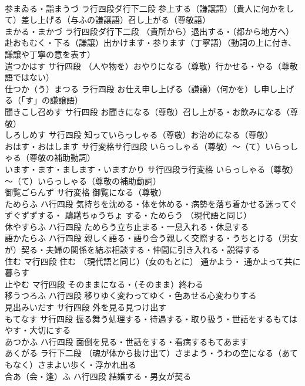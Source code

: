 \documentclass[8pt]{extreport}
\begin{document}
\begin{CJK}{UTF8}{min}
\\	参まゐる・詣まうづ		ラ行四段ダ行下二段	参上する（謙譲語）（貴人に何かをして）差し上げる（与ふの謙譲語）召し上がる（尊敬語）
\\	まかる・まかづ		ラ行四段ダ行下二段	（貴所から）退出する・（都から地方へ） 赴おもむく・下る（謙譲）出かけます・参ります（丁寧語）（動詞の上に付き、謙譲や丁寧の意を表す）
\\	遣つかはす		サ行四段	（人や物を）おやりになる（尊敬）行かせる・やる（尊敬語ではない）
\\	仕つか（う）まつる		ラ行四段	お仕え申し上げる（謙譲）（何かを）し申し上げる（「す」の謙譲語）
\\	聞きこし召めす		サ行四段	お聞きになる（尊敬）召し上がる・お飲みになる（尊敬）
\\	しろしめす		サ行四段	知っていらっしゃる（尊敬）お治めになる（尊敬）
\\	おはす・おはします		サ行変格サ行四段	いらっしゃる（尊敬）～（て）いらっしゃる（尊敬の補助動詞）
\\	います・ます・まします・いますかり		サ行四段ラ行変格	いらっしゃる（尊敬）～（て）いらっしゃる（尊敬の補助動詞）
\\	御覧ごらんず		サ行変格	御覧になる（尊敬）
\\	ためらふ		ハ行四段	気持ちを沈める・体を休める・病勢を落ち着かせる迷ってぐずぐずずする・ 躊躇ちゅうちょ する・ためらう （現代語と同じ）
\\	休やすらふ		ハ行四段	ためらう立ち止まる・一息入れる・休息する
\\	語かたらふ		ハ行四段	親しく語る・語り合う親しく交際する・うちとける（男女が）契る・夫婦の関係を結ぶ相談する・仲間に引き入れる・説得する
\\	住む		マ行四段	住む （現代語と同じ）（女のもとに） 通かよう・ 通かよって共に暮らす
\\	止やむ		マ行四段	そのままになる・（そのまま）終わる
\\	移うつろふ		ハ行四段	移りゆく変わってゆく・色あせる心変わりする
\\	見出みいだす		サ行四段	外を見る見つけ出す
\\	もてなす		サ行四段	振る舞う処理する・待遇する・取り扱う・世話をするもてはやす・大切にする
\\	あつかふ		ハ行四段	面倒を見る・世話をする・看病するもてあます
\\	あくがる		ラ行下二段	（魂が体から抜け出て）さまよう・うわの空になる（あてもなく）さまよい歩く・浮かれ出る
\\	合あ（会・逢）ふ		ハ行四段	結婚する・男女が契る

\end{CJK}
\end{document}
